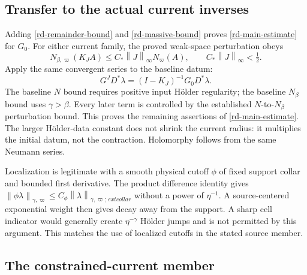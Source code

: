 \documentclass[11pt]{article}
\newcommand{\norm}[1]{\left\lVert#1\right\rVert}
\begin{document}
\subsection{Transfer to the actual current inverses}

Adding \eqref{rd-remainder-bound} and \eqref{rd-massive-bound}
proves \eqref{rd-main-estimate} for $G_0$. For either current
family, the proved weak-space perturbation obeys
\[
 N_{\beta,\varpi}(K_JA)
       \le C_*\norm{J}_\infty N_\varpi(A),\qquad
 C_*\norm{J}_\infty<\tfrac12.
\]
Apply the same convergent series to the baseline datum:
\begin{equation}\label{rd-current-transfer}
 G^JD^*\lambda=(I-K_J)^{-1}G_0D^*\lambda.
\end{equation}
The baseline $N$ bound requires positive input H\"older regularity;
the baseline $N_\beta$ bound uses $\gamma>\beta$. Every later term
is controlled by the established $N$-to-$N_\beta$ perturbation
bound. This proves the remaining assertions of
\eqref{rd-main-estimate}. The larger H\"older-data constant does
not shrink the current radius: it multiplies the initial datum,
not the contraction. Holomorphy follows from the same Neumann series.

Localization is legitimate with a smooth physical cutoff $\phi$
of fixed support collar and bounded first derivative. The product
difference identity gives
$\norm{\phi\lambda}_{\gamma,\varpi}
 \le C_\phi\norm{\lambda}_{\gamma,\varpi;\,	ext{collar}}$
without a power of $\eta^{-1}$. A source-centered exponential weight
then gives decay away from the support. A sharp cell indicator
would generally create $\eta^{-\gamma}$ H\"older jumps and is not
permitted by this argument. This matches the use of localized
cutoffs in the stated source member.

\subsection{The constrained-current member}
\end{document}
